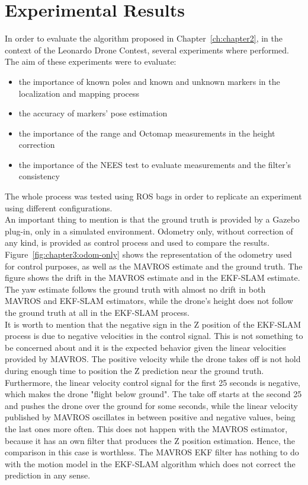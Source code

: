 \chapter{Experimental Results}
\label{ch:chapter3}
In order to evaluate the algorithm proposed in Chapter~\ref{ch:chapter2}, in the context of the Leonardo Drone Contest, several experiments where performed. The aim of these experiments were to evaluate:
\begin{itemize}
    \item{the importance of known poles and known and unknown markers in the localization and mapping process}
    \item{the accuracy of markers' pose estimation}
    \item{the importance of the range and Octomap measurements in the height correction}
    \item{the importance of the \ac{NEES} test to evaluate measurements and the filter's consistency}
\end{itemize}
The whole process was tested using \ac{ROS} bags in order to replicate an experiment using different configurations.\\

An important thing to mention is that the ground truth is provided by a Gazebo plug-in, only in a simulated environment. Odometry only, without correction of any kind, is provided as control process and used to compare the results. \\

Figure~\ref{fig:chapter3:odom-only} shows the representation of the odometry used for control purposes, as well as the MAVROS estimate and the ground truth. The figure shows the drift in the MAVROS estimate and in the EKF-SLAM estimate. The yaw estimate follows the ground truth with almost no drift in both MAVROS and EKF-SLAM estimators, while the drone's height does not follow the ground truth at all in the EKF-SLAM process.\\

It is worth to mention that the negative sign in the Z position of the EKF-SLAM process is due to negative velocities in the control signal. This is not something to be concerned about and it is the expected behavior given the linear velocities provided by MAVROS. The positive velocity while the drone takes off is not hold during enough time to position the Z prediction near the ground truth. Furthermore, the linear velocity control signal for the first 25 seconds is negative, which makes the drone "flight below ground". The take off starts at the second 25 and pushes the drone over the ground for some seconds, while the linear velocity published by MAVROS oscillates in between positive and negative values, being the last ones more often. This does not happen with the MAVROS estimator, because it has an own filter that produces the Z position estimation. Hence, the comparison in this case is worthless. The MAVROS \ac{EKF} filter has nothing to do with the motion model in the EKF-SLAM algorithm which does not correct the prediction in any sense.\\

